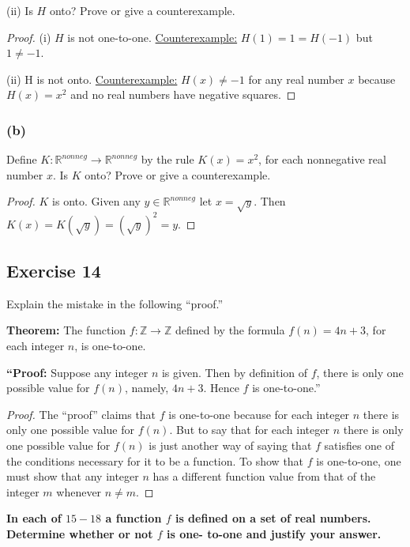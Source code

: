\documentclass[14pt]{extarticle}
\newcommand{\R}{\mathbb{R}}
\newcommand{\Z}{\mathbb{Z}}
\newcommand{\cy}{\color{cyan}}
\begin{document}
(ii) Is $H$ onto? Prove or give a counterexample.

\begin{proof}
(i) $H$ is not one-to-one. \underline{Counterexample:} \(H(1) = 1 = H(-1)\) but \(1 \neq -1\).

(ii) H is not onto. \underline{Counterexample:} \(H(x) \neq -1\) for any real number $x$ because \(H(x) = x^2\) and no 
real numbers have negative squares.
\end{proof}

\subsubsection{(b)}
Define \(K: \R^{nonneg} \to \R^{nonneg}\) by the rule \(K(x) = x^2\), for each nonnegative real number $x$. 
Is $K$ onto? Prove or give a counterexample.

\begin{proof}
$K$ is onto. Given any \(y \in \R^{nonneg}\) let \(x = \sqrt{y}\). Then \(K(x) = K(\sqrt{y}) = (\sqrt{y})^2 = y\).
\end{proof}

\subsection{Exercise 14}
Explain the mistake in the following “proof.”

{\bf Theorem:} The function \(f: \Z \to \Z\) defined by the formula \(f(n) = 4n + 3\), for each integer $n$, is one-to-one.

{\bf “Proof:} Suppose any integer $n$ is given. Then by definition of $f$, there is only one possible value for 
$f(n)$, namely, \(4n + 3\). Hence $f$ is one-to-one.”

\begin{proof}
The “proof” claims that $f$ is one-to-one because for each integer $n$ there is only one possible value for $f(n)$. 
But to say that for each integer $n$ there is only one possible value for $f(n)$ is just another way of saying 
that $f$ satisfies one of the conditions necessary for it to be a function. To show that $f$ is one-to-one, one must 
show that any integer $n$ has a different function value from that of the integer $m$ whenever \(n \neq m\).
\end{proof}

{\bf \cy In each of $15-18$ a function $f$ is defined on a set of real numbers. Determine whether or not $f$ is one-
to-one and justify your answer.}
\end{document}
